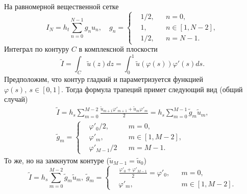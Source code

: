 \documentclass[12pt, a4paper]{article}
\begin{document}
	На равномерной вещественной сетке
	\begin{equation}
		I_{N} = h_{t}\sum_{n = 0}^{N - 1}g_{n}u_{n},\quad
		g_{n}=
		\left\{\begin{aligned}
			&1/2, &&n = 0,\\
			&1, &&n\in\left[1,N-2\right],\\
			&1/2, &&n=N-1.
		\end{aligned}\right.
	\end{equation}
	Интеграл по контуру $C$ в комплексной плоскости
	\begin{equation}
		\tilde{I}=\int_{C}\tilde{u}\left(z\right)dz=\int_{0}^{1}\tilde{u}\left(\varphi\left(s\right)\right)\varphi'\left(s\right)ds.
	\end{equation}
	Предположим, что контур гладкий и параметризуется функцией $\varphi\left(s\right),~s\in\left[0,1\right]$. Тогда формула трапеций примет следующий вид (общий случай)
	\begin{multline}
		\tilde{I} = h_{s}\sum_{m = 0}^{M - 2}\frac{\tilde{u}_{m+1}\varphi'_{m+1} + \tilde{u}_{m}\varphi'_{m}}{2} =h_{s}\sum_{m=0}^{M-1}\tilde{g}_{m}\tilde{u}_{m},\\
		\tilde{g}_{m}=
		\left\{\begin{aligned}
			&\varphi'_{0}/2, &&m = 0,\\
			&\varphi'_{m}, && m\in\left[1,M-2\right],\\
			&\varphi'_{M-1}/2 && m = M-1.
		\end{aligned}\right.
	\end{multline}
	То же, но на замкнутом контуре ($\tilde{u}_{M-1} = \tilde{u}_{0}$)
	\begin{equation}
		\tilde{I} =h_{s}\sum_{m=0}^{M-2}\tilde{g}_{m}\tilde{u}_{m},~
		\tilde{g}_{m}=
		\left\{\begin{aligned}
			&\frac{\varphi'_{0} + \varphi'_{M-1}}{2}=\varphi'_{0}, &&m = 0,\\
			&\varphi'_{m}, && m\in\left[1,M-2\right].
		\end{aligned}\right.
	\end{equation}
	
%	
	
	
	
\end{document}
